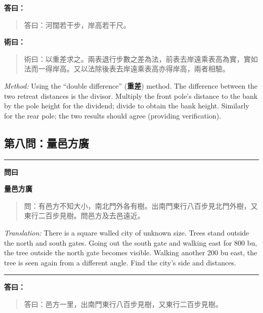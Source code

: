 \documentclass[11pt,a4paper]{article}
\newenvironment{problem}[1][]{%
  \medskip\noindent\rule{\textwidth}{0.4pt}%
  \par\noindent\textbf{\color{sectioncolor}#1}\par\nopagebreak%
  \smallskip%
}{%
  \par\noindent\rule{\textwidth}{0.4pt}\medskip%
}
\newenvironment{answer}{%
  \medskip\noindent{\color{answercolor}\rule{0.5\textwidth}{0.5pt}}%
  \par\color{answercolor}%
}{%
  \par\medskip%
}
\newenvironment{method}{%
  \medskip\noindent{\color{methodcolor}\rule{0.5\textwidth}{0.5pt}}%
  \par\color{methodcolor}%
}{%
  \par\medskip%
}
\begin{document}
\begin{answer}
\textbf{答曰：}

\begin{quote}
\textcolor{chinacolor}{%
答曰：河闊若干步，岸高若干尺。
}
\end{quote}
\end{answer}

\begin{method}
\textbf{術曰：}

\begin{quote}
\textcolor{chinacolor}{%
術曰：以重差求之。兩表退行步數之差為法，前表去岸遠乘表高為實，實如法而一得岸高。又以法除後表去岸遠乘表高亦得岸高，兩者相驗。
}
\end{quote}

\textit{Method:} Using the ``double difference'' (\textbf{重差}) method. The 
difference between the two retreat distances is the divisor. Multiply 
the front pole's distance to the bank by the pole height for the dividend; 
divide to obtain the bank height. Similarly for the rear pole; the two 
results should agree (providing verification).
\end{method}

\subsection*{第八問：量邑方廣}

\begin{problem}[\textbf{問曰}]
\textbf{\color{sectioncolor}量邑方廣}

\begin{quote}
\textcolor{chinacolor}{%
問：有邑方不知大小，南北門外各有樹。出南門東行八百步見北門外樹，又東行二百步見樹。問邑方及去邑遠近。
}
\end{quote}

\textit{Translation:} There is a square walled city of unknown size. Trees 
stand outside the north and south gates. Going out the south gate and 
walking east for 800 bu, the tree outside the north gate becomes visible. 
Walking another 200 bu east, the tree is seen again from a different 
angle. Find the city's side and distances.
\end{problem}

\begin{answer}
\textbf{答曰：}

\begin{quote}
\textcolor{chinacolor}{%
答曰：邑方一里，出南門東行八百步見樹，又東行二百步見樹。
}
\end{quote}
\end{answer}
\end{document}
